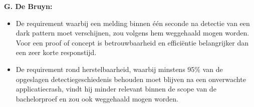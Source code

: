 \textbf{G. De Bruyn:}
\begin{itemize}
    \item De requirement waarbij een melding binnen één seconde na detectie van een dark pattern moet verschijnen, zou volgens hem weggehaald mogen worden. Voor een proof of concept is betrouwbaarheid en efficiëntie belangrijker dan een zeer korte responstijd.
    \item De requirement rond herstelbaarheid, waarbij minstens 95\% van de opgeslagen detectiegeschiedenis behouden moet blijven na een onverwachte applicatiecrash, vindt hij minder relevant binnen de scope van de bachelorproef en zou ook weggehaald mogen worden. 
\end{itemize}